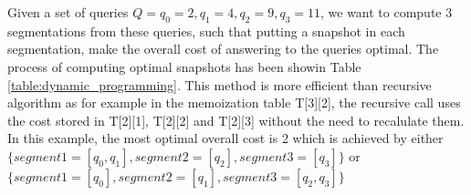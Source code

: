 \begin{example}
	Given a set of queries $Q={q_0=2,q_1=4,q_2=9,q_3=11}$, we want to compute 3 segmentations from these queries, such that putting a snapshot in each segmentation, make the overall cost of answering to the queries optimal. The process of computing optimal snapshots has been showin Table \ref{table:dynamic_programming}. This method is more efficient than recursive algorithm as for example in the memoization table T[3][2], the recursive call uses the cost stored in T[2][1], T[2][2] and T[2][3] without the need to recalulate them. In this example, the most optimal overall cost is 2 which is achieved by either $\{segment1 =[q_0,q_1],segment2=[q_2],segment3=[q_3]\}$ or $\{segment1 =[q_0], segment2 = [q_1], segment3 = [q_2, q_3]\}$
\label{example:dynamic_programming}
\end{example}

